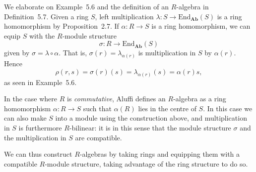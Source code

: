 \documentclass[article, a4paper, 11pt, oneside]{memoir}
\numberwithin{equation}{chapter}
\newcommand{\ncat}[1]{\mathbf{#1}} %
\newcommand{\catAb}{\ncat{Ab}} %
\newcommand{\End}{\mathrm{End}}
\theoremstyle{nonumberplain}
\begin{document}
\begin{remark}
    We elaborate on Example~5.6 and the definition of an $R$-algebra in Definition~5.7. Given a ring $S$, left multiplication $\lambda \colon S \to \End_\catAb(S)$ is a ring homomorphism by Proposition~2.7. If $\alpha \colon R \to S$ is a ring homomorphism, we can equip $S$ with the $R$-module structure
    \begin{equation*}
        \sigma \colon R \to \End_\catAb(S)
    \end{equation*}
    given by $\sigma = \lambda \circ \alpha$. That is, $\sigma(r) = \lambda_{\alpha(r)}$ is multiplication in $S$ by $\alpha(r)$. Hence
    \begin{equation*}
        \rho(r,s)
            = \sigma(r)(s)
            = \lambda_{\alpha(r)}(s)
            = \alpha(r)s,
    \end{equation*}
    as seen in Example~5.6.

    In the case where $R$ is \emph{commutative}, Aluffi defines an $R$-algebra as a ring homomorphism $\alpha \colon R \to S$ such that $\alpha(R)$ lies in the centre of $S$. In this case we can also make $S$ into a module using the construction above, and multiplication in $S$ is furthermore $R$-bilinear: it is in this sense that the module structure $\sigma$ and the multiplication in $S$ are compatible.

    We can thus construct $R$-algebras by taking rings and equipping them with a compatible $R$-module structure, taking advantage of the ring structure to do so.


\end{remark}
\end{document}

